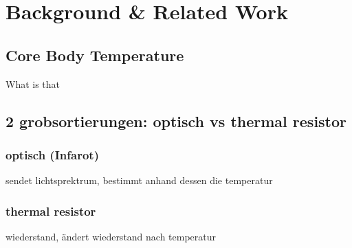 
\chapter{Background \& Related Work}
\label{ch:Background}

\section{Core Body Temperature}

What is that \cite{chenInearThermometerWearable2020}

\section{2 grobsortierungen: optisch vs thermal resistor}
\subsection{optisch (Infarot)}
sendet lichtsprektrum, bestimmt anhand dessen die temperatur

\subsection{thermal resistor}
 wiederstand, ändert wiederstand nach temperatur
